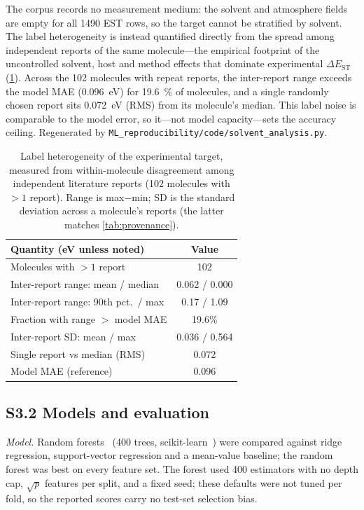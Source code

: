 \documentclass[twoside,twocolumn,9pt]{extarticle}
\begin{document}
The corpus records no measurement medium: the solvent and atmosphere fields are
empty for all \num{1490} EST rows, so the target cannot be stratified by solvent.
The label heterogeneity is instead quantified directly from the spread among
independent reports of the same molecule---the empirical footprint of the
uncontrolled solvent, host and method effects that dominate experimental
$\Delta E_\text{ST}$~\cite{Olivier2017} (\cref{tab:solvent}). Across the \num{102}
molecules with repeat reports, the inter-report range exceeds the model MAE
(\qty{0.096}{\electronvolt}) for \qty{19.6}{\percent} of molecules, and a single
randomly chosen report sits \qty{0.072}{\electronvolt} (RMS) from its molecule's
median. This label noise is comparable to the model error, so it---not model
capacity---sets the accuracy ceiling. Regenerated by
\texttt{ML\_reproducibility/code/solvent\_analysis.py}.

\begin{table}[htbp]
  \centering
  \caption{Label heterogeneity of the experimental target, measured from
    within-molecule disagreement among independent literature reports
    (\num{102} molecules with $>1$ report). Range is max$-$min; SD is the standard
    deviation across a molecule's reports (the latter matches \cref{tab:provenance}).}
  \label{tab:solvent}
  \footnotesize
  \begin{tabular}{lc}
    \toprule
    Quantity (eV unless noted) & Value \\
    \midrule
    Molecules with $>1$ report                 & 102 \\
    Inter-report range: mean / median          & 0.062 / 0.000 \\
    Inter-report range: 90th pct.\ / max       & 0.17 / 1.09 \\
    Fraction with range $>$ model MAE          & 19.6\% \\
    Inter-report SD: mean / max                & 0.036 / 0.564 \\
    Single report vs median (RMS)              & 0.072 \\
    \midrule
    Model MAE (reference)                      & 0.096 \\
    \bottomrule
  \end{tabular}
\end{table}

\subsection*{S3.2 Models and evaluation}
\emph{Model.} Random forests~\cite{Breiman2001} (\num{400} trees,
scikit-learn~\cite{Pedregosa2011}) were compared against ridge regression,
support-vector regression and a mean-value baseline; the random forest was best on
every feature set. The forest used \num{400} estimators with no depth cap, $\sqrt{p}$
features per split, and a fixed seed; these defaults were not tuned per fold, so the
reported scores carry no test-set selection bias.
\end{document}
